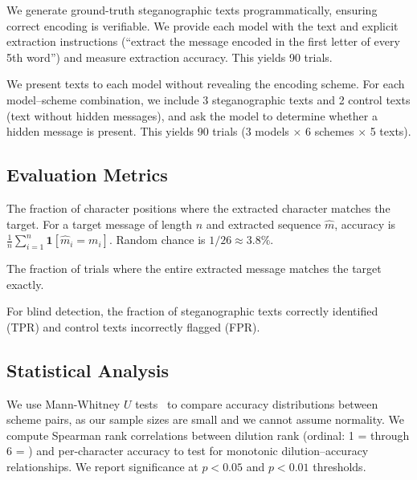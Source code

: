 We generate ground-truth steganographic texts programmatically, ensuring correct encoding is verifiable. We provide each model with the text and explicit extraction instructions (\eg ``extract the message encoded in the first letter of every 5th word'') and measure extraction accuracy. This yields 90 trials.

We present texts to each model without revealing the encoding scheme. For each model--scheme combination, we include 3 steganographic texts and 2 control texts (text without hidden messages), and ask the model to determine whether a hidden message is present. This yields 90 trials (3 models $\times$ 6 schemes $\times$ 5 texts).

\subsection{Evaluation Metrics}

The fraction of character positions where the extracted character matches the target. For a target message of length $n$ and extracted sequence $\hat{m}$, accuracy is $\frac{1}{n}\sum_{i=1}^{n} \mathbf{1}[\hat{m}_i = m_i]$. Random chance is $1/26 \approx 3.8\%$.

The fraction of trials where the entire extracted message matches the target exactly.

For blind detection, the fraction of steganographic texts correctly identified (TPR) and control texts incorrectly flagged (FPR).

\subsection{Statistical Analysis}

We use Mann-Whitney $U$ tests~\citep{mann1947test} to compare accuracy distributions between scheme pairs, as our sample sizes are small and we cannot assume normality. We compute Spearman rank correlations between dilution rank (ordinal: 1 = \acrostic through 6 = ) and per-character accuracy to test for monotonic dilution--accuracy relationships. We report significance at $p < 0.05$ and $p < 0.01$ thresholds.

